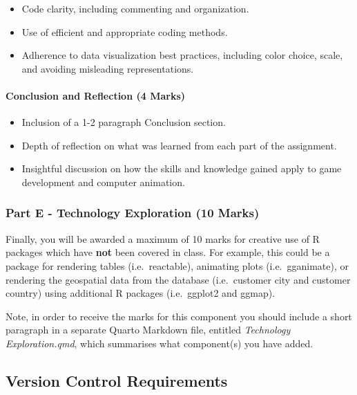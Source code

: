 \documentclass[
  letterpaper,
  DIV=11,
  numbers=noendperiod]{scrartcl}
\let\oldparagraph\paragraph
\renewcommand{\paragraph}[1]{\oldparagraph{#1}\mbox{}}
\providecommand{\tightlist}{%
  \setlength{\itemsep}{0pt}\setlength{\parskip}{0pt}}\usepackage{longtable,booktabs,array}
\begin{document}
\begin{itemize}
\tightlist
\item
  Code clarity, including commenting and organization.
\item
  Use of efficient and appropriate coding methods.
\item
  Adherence to data visualization best practices, including color
  choice, scale, and avoiding misleading representations.
\end{itemize}

\hypertarget{conclusion-and-reflection-4-marks}{%
\paragraph{Conclusion and Reflection (4
Marks)}\label{conclusion-and-reflection-4-marks}}

\begin{itemize}
\tightlist
\item
  Inclusion of a 1-2 paragraph Conclusion section.
\item
  Depth of reflection on what was learned from each part of the
  assignment.
\item
  Insightful discussion on how the skills and knowledge gained apply to
  game development and computer animation.
\end{itemize}

\hypertarget{part-e---technology-exploration-10-marks}{%
\subsubsection{Part E - Technology Exploration (10
Marks)}\label{part-e---technology-exploration-10-marks}}

Finally, you will be awarded a maximum of 10 marks for creative use of R
packages which have \textbf{not} been covered in class. For example,
this could be a package for rendering tables (i.e.~reactable), animating
plots (i.e.~gganimate), or rendering the geospatial data from the
database (i.e.~customer city and customer country) using additional R
packages (i.e.~ggplot2 and ggmap).

Note, in order to receive the marks for this component you should
include a short paragraph in a separate Quarto Markdown file, entitled
\emph{Technology Exploration.qmd}, which summarises what component(s)
you have added.

\hypertarget{version-control-requirements}{%
\subsection{Version Control
Requirements}\label{version-control-requirements}}
\end{document}
